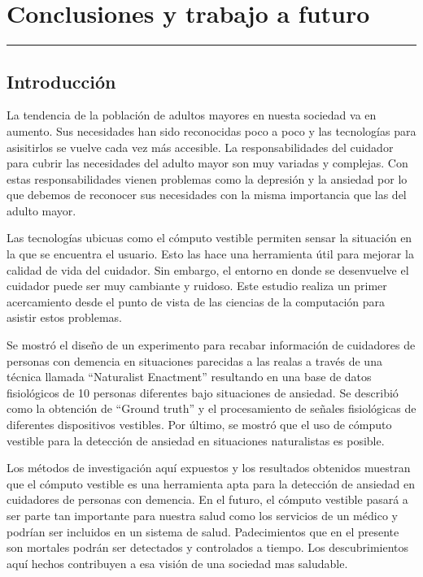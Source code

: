 
\chapter{Conclusiones y trabajo a futuro}\label{capit:cap5}
\vspace{-2.0325ex}%
\noindent
\rule{\textwidth}{0.5pt}
\vspace{-5.5ex}%
\newcommand{\pushline}{\Indp}%

\section{Introducci\'on}
	La tendencia de la poblaci\'on de adultos mayores en nuesta sociedad va en aumento. Sus necesidades han sido reconocidas poco a poco y las tecnolog\'ias para asisitirlos se vuelve cada vez m\'as accesible. La responsabilidades del cuidador para cubrir las necesidades del adulto mayor son muy variadas y complejas. Con estas responsabilidades vienen problemas como la depresi\'on y la ansiedad por lo que debemos de reconocer sus necesidades con la misma importancia que las del adulto mayor.

	Las tecnolog\'ias ubicuas como el c\'omputo vestible permiten sensar la situaci\'on en la que se encuentra el usuario. Esto las hace una herramienta \'util para mejorar la calidad de vida del cuidador. Sin embargo, el entorno en donde se desenvuelve el cuidador puede ser muy cambiante y ruidoso. Este estudio realiza un primer acercamiento desde el punto de vista de las ciencias de la computaci\'on para asistir estos problemas.

	Se mostr\'o el dise\~no de un experimento para recabar informaci\'on de cuidadores de personas con demencia en situaciones parecidas a las realas a trav\'es de una t\'ecnica llamada ``Naturalist Enactment'' resultando en una base de datos fisiol\'ogicos de 10 personas diferentes bajo situaciones de ansiedad. Se describi\'o como la obtenci\'on de ``Ground truth'' y el procesamiento de se\~nales fisiol\'ogicas de diferentes dispositivos vestibles. Por \'ultimo, se mostr\'o que el uso de c\'omputo vestible para la detecci\'on de ansiedad en situaciones naturalistas es posible.

Los m\'etodos de investigaci\'on aqu\'i expuestos y los resultados obtenidos muestran que el c\'omputo vestible es una herramienta apta para la detecci\'on de ansiedad en cuidadores de personas con demencia. En el futuro, el c\'omputo vestible pasar\'a a ser parte tan importante para nuestra salud como los servicios de un m\'edico y podr\'ian ser incluidos en un sistema de salud. Padecimientos que en el presente son mortales podr\'an ser detectados y controlados a tiempo. Los descubrimientos aqu\'i hechos contribuyen a esa visi\'on de una sociedad mas saludable.

